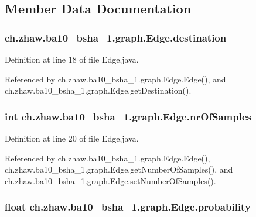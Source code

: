 \subsection{Member Data Documentation}
\hypertarget{classch_1_1zhaw_1_1ba10__bsha__1_1_1graph_1_1Edge_afa6d59aea26f9d343e7f7145fad87579}{
\subsubsection[{destination}]{ {\bf ch.zhaw.ba10\_\-bsha\_\-1.graph.Edge.destination}}}
\label{classch_1_1zhaw_1_1ba10__bsha__1_1_1graph_1_1Edge_afa6d59aea26f9d343e7f7145fad87579}


Definition at line 18 of file Edge.java.

Referenced by ch.zhaw.ba10\_\-bsha\_\-1.graph.Edge.Edge(), and ch.zhaw.ba10\_\-bsha\_\-1.graph.Edge.getDestination().\hypertarget{classch_1_1zhaw_1_1ba10__bsha__1_1_1graph_1_1Edge_a54657658be3fa498c1a4c0f5d4ef57c6}{
\subsubsection[{nrOfSamples}]{\setlength{\rightskip}{0pt plus 5cm}int {\bf ch.zhaw.ba10\_\-bsha\_\-1.graph.Edge.nrOfSamples}}}
\label{classch_1_1zhaw_1_1ba10__bsha__1_1_1graph_1_1Edge_a54657658be3fa498c1a4c0f5d4ef57c6}


Definition at line 20 of file Edge.java.

Referenced by ch.zhaw.ba10\_\-bsha\_\-1.graph.Edge.Edge(), ch.zhaw.ba10\_\-bsha\_\-1.graph.Edge.getNumberOfSamples(), and ch.zhaw.ba10\_\-bsha\_\-1.graph.Edge.setNumberOfSamples().\hypertarget{classch_1_1zhaw_1_1ba10__bsha__1_1_1graph_1_1Edge_ab718be8d9785b729e2f34a95e1560eb8}{
\subsubsection[{probability}]{\setlength{\rightskip}{0pt plus 5cm}float {\bf ch.zhaw.ba10\_\-bsha\_\-1.graph.Edge.probability}}}
\label{classch_1_1zhaw_1_1ba10__bsha__1_1_1graph_1_1Edge_ab718be8d9785b729e2f34a95e1560eb8}


